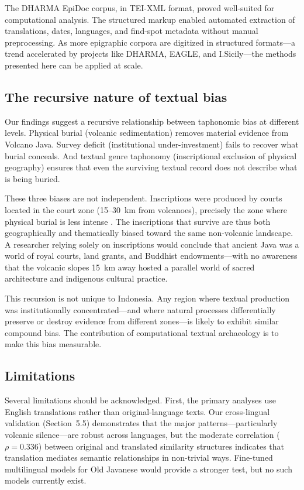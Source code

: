\documentclass[12pt]{article}
\begin{document}
The DHARMA EpiDoc corpus, in TEI-XML format, proved well-suited for computational analysis.
The structured markup enabled automated extraction of translations, dates, languages, and find-spot metadata without manual preprocessing.
As more epigraphic corpora are digitized in structured formats---a trend accelerated by projects like DHARMA, EAGLE, and I.Sicily---the methods presented here can be applied at scale.

\subsection{The recursive nature of textual bias}

Our findings suggest a recursive relationship between taphonomic bias at different levels.
Physical burial (volcanic sedimentation) removes material evidence from Volcano Java.
Survey deficit (institutional under-investment) fails to recover what burial conceals.
And textual genre taphonomy (inscriptional exclusion of physical geography) ensures that even the surviving textual record does not describe what is being buried.

These three biases are not independent.
Inscriptions were produced by courts located in the court zone (15--30~km from volcanoes), precisely the zone where physical burial is less intense \citep[submitted]{Amien2026b}.
The inscriptions that survive are thus both geographically and thematically biased toward the same non-volcanic landscape.
A researcher relying solely on inscriptions would conclude that ancient Java was a world of royal courts, land grants, and Buddhist endowments---with no awareness that the volcanic slopes 15~km away hosted a parallel world of sacred architecture and indigenous cultural practice.

This recursion is not unique to Indonesia.
Any region where textual production was institutionally concentrated---and where natural processes differentially preserve or destroy evidence from different zones---is likely to exhibit similar compound bias.
The contribution of computational textual archaeology is to make this bias measurable.

\subsection{Limitations}

Several limitations should be acknowledged.
First, the primary analyses use English translations rather than original-language texts.
Our cross-lingual validation (Section~5.5) demonstrates that the major patterns---particularly volcanic silence---are robust across languages, but the moderate correlation ($\rho = 0.336$) between original and translated similarity structures indicates that translation mediates semantic relationships in non-trivial ways.
Fine-tuned multilingual models for Old Javanese would provide a stronger test, but no such models currently exist.
\end{document}
